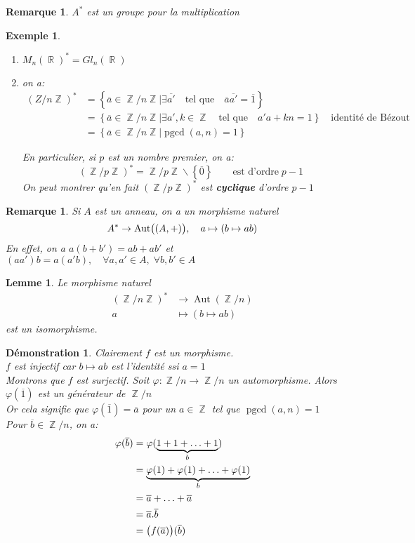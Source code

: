\documentclass[a4paper, oneside]{report}
\theoremstyle{break}
\newtheorem{lemme}[thm]{Lemme}
\newtheorem{exemple}[thm]{Exemple}
\newtheorem{remarque}[thm]{Remarque}
\newtheorem*{demonstration}{Démonstration}
\DeclareMathOperator{\R}{\mathbb{R}}
\DeclareMathOperator{\Z}{\mathbb{Z}}
\DeclarePairedDelimiter\ens{\left\{ }{\right\} }%
\DeclarePairedDelimiter\pa{\big(}{\big)}%
\DeclareMathOperator{\pgcd}{pgcd}
\DeclareMathOperator{\Aut}{Aut}
\renewcommand{\ens}[1]{\left\{ #1 \right\} }%
\newcommand{\slign}{\textbf}
\newcommand{\ol}{\overline}
\newcommand{\ub}{\underbrace}
\newcommand{\Ens}{\ens}
\begin{document}
\begin{remarque}
$A^*$ est un groupe pour la multiplication
\end{remarque}

\begin{exemple}
\begin{enumerate}
\item  $M_n(\R)^* = Gl_n(\R)$

\medbreak

\item  on a:
\begin{align*}
(Z/n\Z)^* &= \Ens{\ol{a} \in \Z/n\Z \big| \exists \ol{a'}	\quad	\text{tel que}	\quad	\ol{a}\ol{a'} = \ol{1}}
\\
&= \Ens{\ol{a} \in \Z/n\Z \big| \exists a', k \in \Z		\quad	\text{tel que}		\quad	a'a+kn = 1}	\quad	\text{identité de Bézout}
\\
&= \Ens{\ol{a} \in \Z/n\Z \big| \pgcd(a,n) = 1}
\end{align*}

En particulier, si $p$ est un nombre premier, on a:
\[
(\Z/p\Z)^* = \Z/p\Z \backslash \ens{\ol{0}}	\qquad	\text{est d'ordre} \; p - 1
\]
On peut montrer qu'en fait $(\Z/p\Z)^*$ est \slign{cyclique} d'ordre $p - 1$
\end{enumerate}
\end{exemple}

\begin{remarque}
Si $A$ est un anneau, on a un morphisme naturel
\[
A^* \rightarrow \Aut\pa{(A, +)}, 	\quad	a \mapsto (b \mapsto ab)
\]
En effet, on a $a(b+b') = ab + ab'$ et $(aa') b = a(a'b),	\quad	\forall a, a' \in A, \; \forall b, b' \in A$
\end{remarque}

\begin{lemme}
Le morphisme naturel
\begin{align*}
(\Z/n\Z)^* &\rightarrow \Aut(\Z/n)
\\
a &\mapsto (b \mapsto ab)
\end{align*}
est un isomorphisme.
\end{lemme}

\begin{demonstration}
Clairement $f$ est un morphisme.\\
$f$ est injectif car $b \mapsto ab$ est l'identité ssi $a = 1$\\
Montrons que $f$ est surjectif. Soit $\varphi : \Z/n \rightarrow \Z/n$ un automorphisme. Alors $\varphi(\ol{1})$ est un générateur de $\Z/n$\\
Or cela signifie que $\varphi(\ol{1}) = \ol{a}$ pour un $a \in \Z$ tel que $\pgcd(a, n) = 1$\\
Pour $\ol{b} \in \Z/n$, on a:
\begin{align*}
\varphi(\ol{b}) &= \varphi(\ub{1 + 1 + \ldots + 1}_{b}) 
\\
&= \ub{\varphi(1) + \varphi(1) + \ldots + \varphi(1)}_{b} 
\\
&= \ol{a} + \ldots + \ol{a} 
\\
&= \ol{a} . \ol{b}
\\
&= \pa{f(\ol{a})}(\ol{b})
\end{align*}
~
\end{demonstration}
\end{document}
